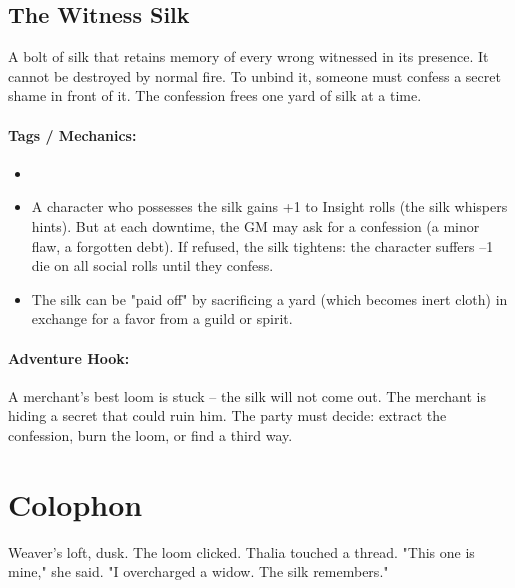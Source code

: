 \subsection*{The Witness Silk}

A bolt of silk that retains memory of every wrong witnessed in its presence. It cannot be destroyed by normal fire. To unbind it, someone must confess a secret shame in front of it. The confession frees one yard of silk at a time.

\paragraph{Tags / Mechanics:}
\begin{itemize}
\item [TRUTH] [CURSE]
\item A character who possesses the silk gains +1 to Insight rolls (the silk whispers hints). But at each downtime, the GM may ask for a confession (a minor flaw, a forgotten debt). If refused, the silk tightens: the character suffers --1 die on all social rolls until they confess.
\item The silk can be "paid off" by sacrificing a yard (which becomes inert cloth) in exchange for a favor from a guild or spirit.
\end{itemize}

\paragraph{Adventure Hook:}
A merchant's best loom is stuck -- the silk will not come out. The merchant is hiding a secret that could ruin him. The party must decide: extract the confession, burn the loom, or find a third way.

\section*{Colophon}
Weaver's loft, dusk. The loom clicked. Thalia touched a thread. "This one is mine," she said. "I overcharged a widow. The silk remembers."

